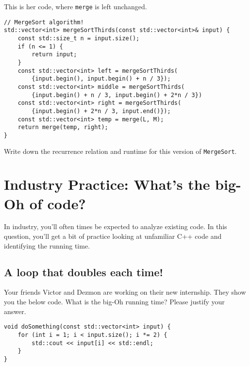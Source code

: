 \documentclass [12pt]{article}
\begin{document}
This is her code, where \texttt{merge} is left unchanged.

\vspace{2em}
\begin{verbatim}
// MergeSort algorithm!
std::vector<int> mergeSortThirds(const std::vector<int>& input) {
    const std::size_t n = input.size();
    if (n <= 1) {
        return input;
    }
    const std::vector<int> left = mergeSortThirds(
        {input.begin(), input.begin() + n / 3});
    const std::vector<int> middle = mergeSortThirds(
        {input.begin() + n / 3, input.begin() + 2*n / 3})
    const std::vector<int> right = mergeSortThirds(
        {input.begin() + 2*n / 3, input.end()});
    const std::vector<int> temp = merge(L, M);
    return merge(temp, right);
}
\end{verbatim}

Write down the recurrence relation and runtime for this version of \texttt{MergeSort}.

 

\pagebreak
\section{Industry Practice: What's the big-Oh of code?}
 In industry, you'll often times be expected to analyze existing code. In this question, you'll get a bit of practice looking at unfamiliar C++ code and identifying the running time.


\subsection{A loop that doubles each time!}
 Your friends Victor and Dezmon are working on their new internship. They show you the below code. What is the big-Oh running time? Please justify your answer.

\vspace{2em}
\begin{verbatim}
void doSomething(const std::vector<int> input) {
    for (int i = 1; i < input.size(); i *= 2) {
        std::cout << input[i] << std::endl;
    }
}
\end{verbatim}

\end{document}
